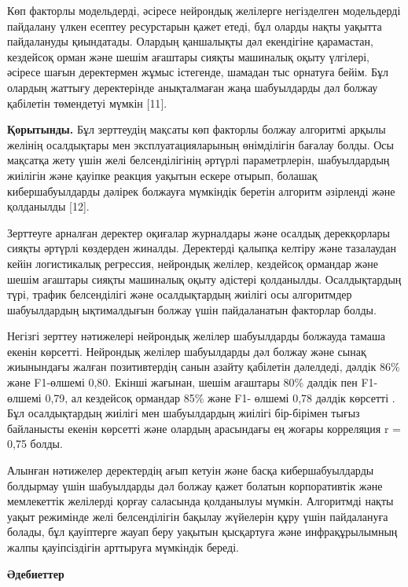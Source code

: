 \begin{multicols}{2}
Көп факторлы модельдерді, әсіресе нейрондық желілерге негізделген
модельдерді пайдалану үлкен есептеу ресурстарын қажет етеді, бұл оларды
нақты уақытта пайдалануды қиындатады. Олардың қаншалықты дәл екендігіне
қарамастан, кездейсоқ орман және шешім ағаштары сияқты машиналық оқыту
үлгілері, әсіресе шағын деректермен жұмыс істегенде, шамадан тыс
орнатуға бейім. Бұл олардың жаттығу деректерінде анықталмаған жаңа
шабуылдарды дәл болжау қабілетін төмендетуі мүмкін {[}11{]}.

{\bfseries Қорытынды.} Бұл зерттеудің мақсаты көп факторлы болжау алгоритмі
арқылы желінің осалдықтары мен эксплуатацияларының өнімділігін бағалау
болды. Осы мақсатқа жету үшін желі белсенділігінің әртүрлі
параметрлерін, шабуылдардың жиілігін және қауіпке реакция уақытын ескере
отырып, болашақ кибершабуылдарды дәлірек болжауға мүмкіндік беретін
алгоритм әзірленді және қолданылды {[}12{]}.

Зерттеуге арналған деректер оқиғалар журналдары және осалдық
дерекқорлары сияқты әртүрлі көздерден жиналды. Деректерді қалыпқа
келтіру және тазалаудан кейін логистикалық регрессия, нейрондық желілер,
кездейсоқ ормандар және шешім ағаштары сияқты машиналық оқыту әдістері
қолданылды. Осалдықтардың түрі, трафик белсенділігі және осалдықтардың
жиілігі осы алгоритмдер шабуылдардың ықтималдығын болжау үшін
пайдаланатын факторлар болды.

Негізгі зерттеу нәтижелері нейрондық желілер шабуылдарды болжауда тамаша
екенін көрсетті. Нейрондық желілер шабуылдарды дәл болжау және сынақ
жиынындағы жалған позитивтердің санын азайту қабілетін дәлелдеді, дәлдік
86\% және F1-өлшемі 0,80. Екінші жағынан, шешім ағаштары 80\% дәлдік пен
F1-өлшемі 0,79, ал кездейсоқ ормандар 85\% және F1- өлшемі 0,78 дәлдік
көрсетті . Бұл осалдықтардың жиілігі мен шабуылдардың жиілігі
бір-бірімен тығыз байланысты екенін көрсетті және олардың арасындағы ең
жоғары корреляция r = 0,75 болды.

Алынған нәтижелер деректердің ағып кетуін және басқа кибершабуылдарды
болдырмау үшін шабуылдарды дәл болжау қажет болатын корпоративтік және
мемлекеттік желілерді қорғау саласында қолданылуы мүмкін. Алгоритмді
нақты уақыт режимінде желі белсенділігін бақылау жүйелерін құру үшін
пайдалануға болады, бұл қауіптерге жауап беру уақытын қысқартуға және
инфрақұрылымның жалпы қауіпсіздігін арттыруға мүмкіндік береді.
\end{multicols}

\begin{center}
{\bfseries Әдебиеттер}
\end{center}

